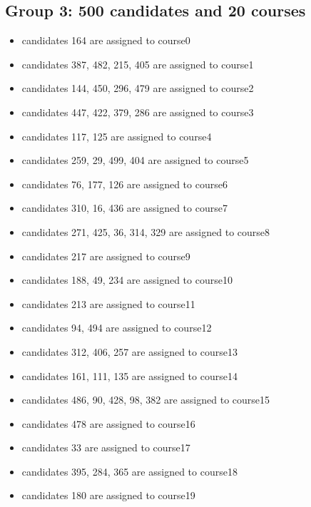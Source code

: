 \documentclass[twoside,twocolumn]{article}
\begin{document}
    \subsection{Group 3: 500 candidates and 20 courses}
    \begin{itemize}
        \item candidates 164 are assigned to course0
        \item candidates 387, 482, 215, 405 are assigned to course1
        \item candidates 144, 450, 296, 479 are assigned to course2
        \item candidates 447, 422, 379, 286 are assigned to course3
        \item candidates 117, 125 are assigned to course4
        \item candidates 259, 29, 499, 404 are assigned to course5
        \item candidates 76, 177, 126 are assigned to course6
        \item candidates 310, 16, 436 are assigned to course7
        \item candidates 271, 425, 36, 314, 329 are assigned to course8
        \item candidates 217 are assigned to course9
        \item candidates 188, 49, 234 are assigned to course10
        \item candidates 213 are assigned to course11
        \item candidates 94, 494 are assigned to course12
        \item candidates 312, 406, 257 are assigned to course13
        \item candidates 161, 111, 135 are assigned to course14
        \item candidates 486, 90, 428, 98, 382 are assigned to course15
        \item candidates 478 are assigned to course16
        \item candidates 33 are assigned to course17
        \item candidates 395, 284, 365 are assigned to course18
        \item candidates 180 are assigned to course19
    \end{itemize}
\end{document}
